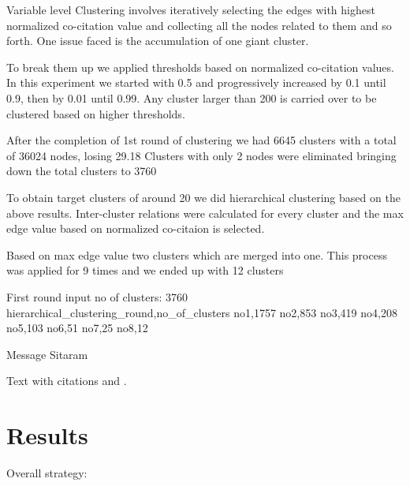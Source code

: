 Variable level Clustering involves iteratively selecting the edges with highest normalized co-citation value and collecting
all the nodes related to them and so forth. One issue faced is the accumulation of one giant cluster.

To break them up we applied thresholds based on normalized co-citation values. In this experiment we started with 0.5 and progressively increased by 0.1
until 0.9, then by 0.01 until 0.99. Any cluster larger than 200 is carried over to be clustered based on higher thresholds. 

After the completion of 1st round of clustering we had 6645 clusters with a total of 36024 nodes, losing 29.18 %
Clusters with only 2 nodes were eliminated bringing down the total clusters to 3760

To obtain target clusters of around 20 we did hierarchical clustering based on the above results. Inter-cluster relations were calculated for every
cluster and the max edge value based on normalized co-citaion is selected. 

Based on max edge value two clusters which are merged into one. This process was applied for 9 times and we ended up with 12 clusters

First round input no of clusters: 3760
hierarchical\_clustering\_round,no\_of\_clusters
no1,1757
no2,853
no3,419
no4,208
no5,103
no6,51
no7,25
no8,12




Message Sitaram



\label{sec:1}
Text with citations \cite{RefB} and \cite{RefJ}.

\section{Results}
\label{sec:2}

Overall strategy:

